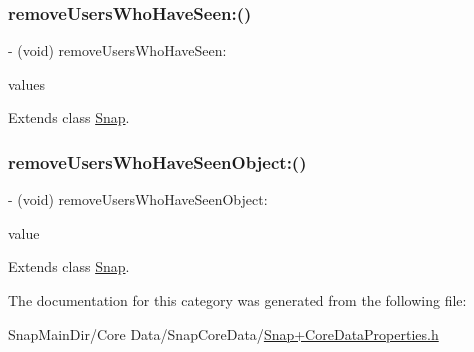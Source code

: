 \subsubsection{\texorpdfstring{remove\+Users\+Who\+Have\+Seen\+:()}{removeUsersWhoHaveSeen:()}}
{\footnotesize\ttfamily -\/ (void) remove\+Users\+Who\+Have\+Seen\+: \begin{DoxyParamCaption}\item[{(N\+S\+Set$<$ \hyperlink{interface_friend}{Friend} $\ast$ $>$ $\ast$)}]{values }\end{DoxyParamCaption}}



Extends class \hyperlink{interface_snap_af4fa1e8b7b4cdd429c312312704b61ab}{Snap}.

\hypertarget{category_snap_07_core_data_generated_accessors_08_ab97c4c0a0f132f6f420ac3127dcd9142}{}\label{category_snap_07_core_data_generated_accessors_08_ab97c4c0a0f132f6f420ac3127dcd9142} 
\subsubsection{\texorpdfstring{remove\+Users\+Who\+Have\+Seen\+Object\+:()}{removeUsersWhoHaveSeenObject:()}}
{\footnotesize\ttfamily -\/ (void) remove\+Users\+Who\+Have\+Seen\+Object\+: \begin{DoxyParamCaption}\item[{(\hyperlink{interface_friend}{Friend} $\ast$)}]{value }\end{DoxyParamCaption}}



Extends class \hyperlink{interface_snap_ab97c4c0a0f132f6f420ac3127dcd9142}{Snap}.



The documentation for this category was generated from the following file\+:\begin{DoxyCompactItemize}
\item 
Snap\+Main\+Dir/\+Core Data/\+Snap\+Core\+Data/\hyperlink{_snap_09_core_data_properties_8h}{Snap+\+Core\+Data\+Properties.\+h}\end{DoxyCompactItemize}
